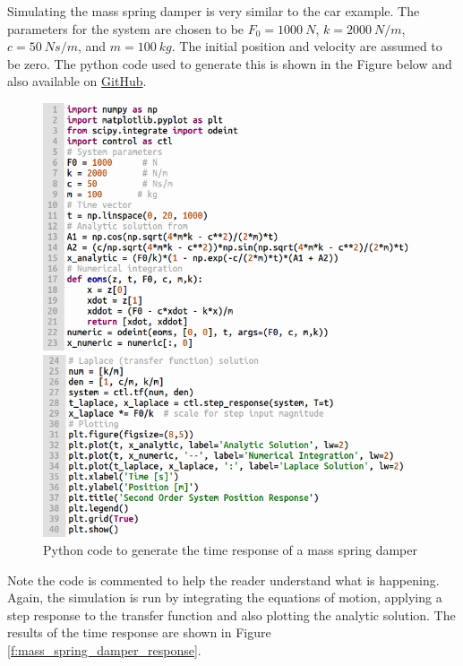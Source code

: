 Simulating the mass spring damper is very similar to the car example. The parameters for the system are chosen to be $F_0=1000~N$, $k=2000~N/m$, $c=50~Ns/m$, and $m=100~kg$. The initial position and velocity are assumed to be zero. The python code used to generate this is shown in the Figure below and also available on \href{https://github.com/cmontalvo251/Python/blob/master/controls/mass_spring_damper.py}{GitHub}. 
\begin{figure}[H]
\centering
\begin{minipage}{0.48\textwidth}
\centering
\includegraphics[width=\linewidth]{Figures/mass_spring_damper_code_1.png}
\end{minipage}\hfill
\begin{minipage}{0.48\textwidth}
\centering
\includegraphics[width=\linewidth]{Figures/mass_spring_damper_code_2.png}
\end{minipage}
\caption{Python code to generate the time response of a mass spring damper}
\label{f:mass_spring_damper_code}
\end{figure}
Note the code is commented to help the reader understand what is happening. Again, the simulation is run by integrating the equations of motion, applying a step response to the transfer function and also plotting the analytic solution. The results of the time response are shown in Figure \ref{f:mass_spring_damper_response}.
